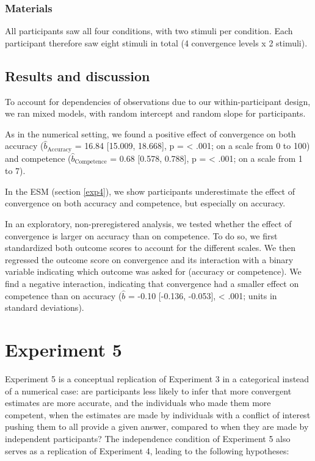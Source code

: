 \documentclass[
  doc,floatsintext]{apa6}
\begin{document}
\subsubsection{Materials}\label{materials-3}

All participants saw all four conditions, with two stimuli per condition. Each participant therefore saw eight stimuli in total (4 convergence levels x 2 stimuli).

\subsection{Results and discussion}\label{results-and-discussion-3}

To account for dependencies of observations due to our within-participant design, we ran mixed models, with random intercept and random slope for participants.

As in the numerical setting, we found a positive effect of convergence on both accuracy (\(\hat{b}_{\text{Accuracy}}\) = 16.84 {[}15.009, 18.668{]}, p = \textless{} .001; on a scale from 0 to 100) and competence (\(\hat{b}_{\text{Competence}}\) = 0.68 {[}0.578, 0.788{]}, p = \textless{} .001; on a scale from 1 to 7).

In the ESM (section \ref{exp4}), we show participants underestimate the effect of convergence on both accuracy and competence, but especially on accuracy.

In an exploratory, non-preregistered analysis, we tested whether the effect of convergence is larger on accuracy than on competence. To do so, we first standardized both outcome scores to account for the different scales. We then regressed the outcome score on convergence and its interaction with a binary variable indicating which outcome was asked for (accuracy or competence). We find a negative interaction, indicating that convergence had a smaller effect on competence than on accuracy (\(\hat{b}\) = -0.10 {[}-0.136, -0.053{]}, \textless{} .001; units in standard deviations).

\section{Experiment 5}\label{experiment-5}

Experiment 5 is a conceptual replication of Experiment 3 in a categorical instead of a numerical case: are participants less likely to infer that more convergent estimates are more accurate, and the individuals who made them more competent, when the estimates are made by individuals with a conflict of interest pushing them to all provide a given answer, compared to when they are made by independent participants? The independence condition of Experiment 5 also serves as a replication of Experiment 4, leading to the following hypotheses:
\end{document}
